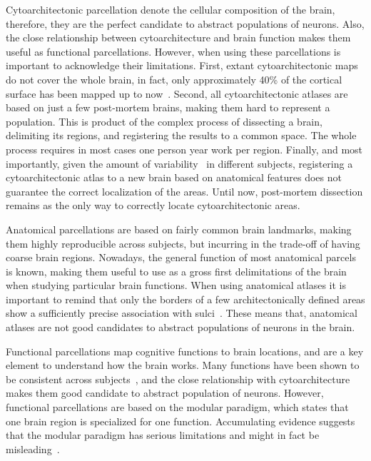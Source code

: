 Cytoarchitectonic parcellation denote the cellular composition of the brain,
therefore, they are the perfect candidate to abstract populations of neurons.
Also, the close relationship between cytoarchitecture and brain function\cite{Amunts2007}
makes them useful as functional parcellations.
However, when using these parcellations is important to acknowledge their limitations.
First, extant cytoarchitectonic maps do not cover the whole brain, in fact, only 
approximately 40\% of the cortical surface has been mapped up to
now~\cite{Amunts2007}. Second, all cytoarchitectonic atlases are based on just
a few post-mortem brains, making them hard to represent a population. This is
product of the complex process of dissecting a brain, delimiting its regions,
and registering the results to a common space. The whole process requires in most
cases one person year work per region. Finally, and most importantly, given the
amount of variability~\cite{Zilles2013} in different subjects, registering a 
cytoarchitectonic atlas to a new brain based on anatomical features does not
guarantee the correct localization of the areas. Until now, post-mortem dissection
remains as the only way to correctly locate cytoarchitectonic areas.

Anatomical parcellations are based on fairly common brain landmarks, making them
highly reproducible across subjects, but incurring in the trade-off of having coarse
brain regions. Nowadays, the general function of most anatomical parcels is
known, making them useful to use as a gross first delimitations of the brain
when studying particular brain functions. When using anatomical atlases it is
important to remind that only the borders of a few architectonically
defined areas show a sufficiently precise association with sulci~\cite{Amunts2007}.
These means that, anatomical atlases are not good candidates to abstract populations
of neurons in the brain.

Functional parcellations map cognitive functions to brain locations, and are
a key element to understand how the brain works. Many functions have been shown
to be consistent across subjects~\cite{Johns, Penfield1954, Yeo2011},
and the close relationship with cytoarchitecture makes them good candidate to
abstract population of neurons. However, functional parcellations are based
on the modular paradigm, which states that one brain region is specialized
for one function. Accumulating evidence suggests that the modular paradigm
has serious limitations and might in fact be misleading~\cite{Bressler2010}.


